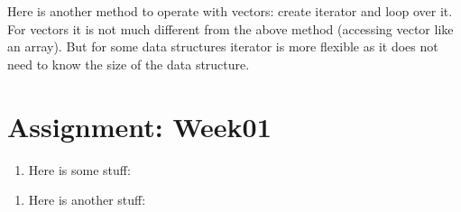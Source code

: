 \documentclass[letterpaper,10pt,english,openany,oneside]{sphinxmanual}
\begin{document}
\begin{sphinxVerbatim}[commandchars=\\\{\}]
   
     
           
      
   
\end{sphinxVerbatim}

\sphinxAtStartPar
Here is another method to operate with vectors: create iterator and loop over it.
For vectors it is not much different from the above method (accessing vector like an array).
But for some data structures iterator is more flexible as it does not need to know the size
of the data structure.


\chapter{Assignment: Week01}
\label{\detokenize{assignment-week01:assignment-week01}}\label{\detokenize{assignment-week01::doc}}\begin{enumerate}
%
\item {} 
\sphinxAtStartPar
Here is some stuff:

\end{enumerate}

\begin{sphinxVerbatim}[commandchars=\\\{\}]
 \PYG{p}{[}\PYG{p}{]}   
                    
     
              
\end{sphinxVerbatim}
\begin{enumerate}
%
\setcounter{enumi}{1}
\item {} 
\sphinxAtStartPar
Here is another stuff:

\end{enumerate}
\end{document}

